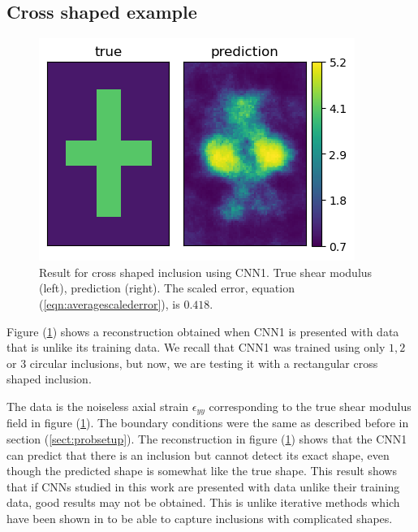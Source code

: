 \documentclass[12pt]{article}
\newcommand{\nhgtotalheight}{4cm}
\begin{document}
\subsection{\label{sect:resultscross} Cross shaped example}
%
\begin{figure}[!h]
  \centering
  \includegraphics[totalheight=\nhgtotalheight]{Figures/ResultCross/mu.png}
  \caption{\label{fig:resultcross} Result for cross shaped inclusion using CNN1. True shear modulus (left), prediction (right). The scaled error, equation (\ref{eqn:averagescalederror}), is $0.418$.}
\end{figure}
%
Figure (\ref{fig:resultcross}) shows a reconstruction obtained when CNN1 is presented with data that is unlike its training data. We recall that CNN1 was trained using only $1,2$ or $3$ circular inclusions, but now, we are testing it with a rectangular cross shaped inclusion.

The data is the noiseless axial strain $\epsilon_{yy}$ corresponding to the true shear modulus field in figure (\ref{fig:resultcross}). The boundary conditions were the same as described before in section (\ref{sect:probsetup}). The reconstruction in figure (\ref{fig:resultcross}) shows that the CNN1 can predict that there is an inclusion but cannot detect its exact shape, even though the predicted shape is somewhat like the true shape. This result shows that if CNNs studied in this work are presented with data unlike their training data, good results may not be obtained. This is unlike iterative methods which have been shown in \cite{paper:oberaipmb2004} to be able to capture inclusions with complicated shapes.
\end{document}
